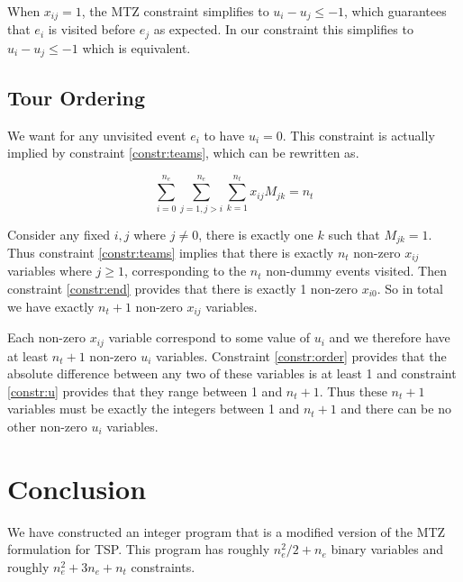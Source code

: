 \documentclass[11pt]{article}
\begin{document}
When $x_{ij} = 1$, the MTZ constraint simplifies to $u_i - u_j \leq -1$, which guarantees that $e_i$ is visited before $e_j$ as expected. In our constraint this simplifies to $u_i - u_j \leq -1$ which is equivalent.

\subsection{Tour Ordering}
We want for any unvisited event $e_i$ to have $u_i = 0$. This constraint is actually implied by constraint \eqref{constr:teams}, which can be rewritten as.

\begin{equation}
    \sum_{i=0}^{n_e} \sum_{j = 1, j > i}^{n_e} \sum_{k=1}^{n_t} x_{ij} M_{jk} = n_t
\end{equation}

Consider any fixed $i, j$ where $j \neq 0$, there is exactly one $k$ such that $M_{jk} = 1$. Thus constraint \eqref{constr:teams} implies that there is exactly $n_t$ non-zero $x_{ij}$ variables where $j \geq 1$, corresponding to the $n_t$ non-dummy events visited. Then constraint \eqref{constr:end} provides that there is exactly 1 non-zero $x_{i0}$. So in total we have exactly $n_t + 1$ non-zero $x_{ij}$ variables.

Each non-zero $x_{ij}$ variable correspond to some value of $u_i$ and we therefore have at least $n_t + 1$ non-zero $u_i$ variables. Constraint \eqref{constr:order} provides that the absolute difference between any two of these variables is at least 1 and constraint \eqref{constr:u} provides that they range between 1 and $n_t + 1$. Thus these $n_t + 1$ variables must be exactly the integers between 1 and $n_t + 1$ and there can be no other non-zero $u_i$ variables.

\section{Conclusion}
We have constructed an integer program that is a modified version of the MTZ formulation for TSP. This program has roughly $n_e^2 / 2 + n_e$ binary variables and roughly $n_e^2 + 3n_e + n_t$ constraints.
\end{document}
